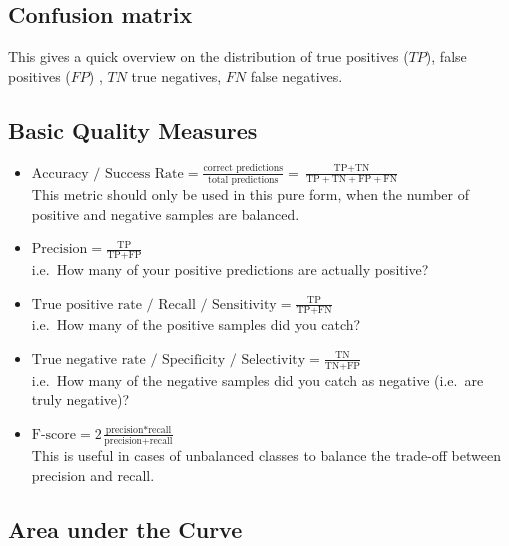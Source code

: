 \documentclass[
]{book}
\begin{document}
\hypertarget{confusion-matrix}{%
\subsection{Confusion matrix}\label{confusion-matrix}}

This gives a quick overview on the distribution of true positives
(\(TP\)), false positives (\(FP\)) , \(TN\) true negatives, \(FN\) false
negatives.

\hypertarget{basic-quality-measures}{%
\subsection{Basic Quality Measures}\label{basic-quality-measures}}

\begin{itemize}
\item
  \(\text{Accuracy / Success Rate} = \frac{ \text{correct predictions}}{\text{total predictions}} = \frac{ \text{TP}+\text{TN}}{\text{TP} + \text{TN}+\text{FP}+\text{FN}}\)\\
  This metric should only be used in this pure form, when the number
  of positive and negative samples are balanced.
\item
  \(\text{Precision} = \frac{\text{TP}}{\text{TP}+\text{FP}}\)\\
  i.e.~How many of your positive predictions are actually positive?
\item
  \(\text{True positive rate / Recall / Sensitivity} = \frac{\text{TP}}{\text{TP}+\text{FN}}\)\\
  i.e.~How many of the positive samples did you catch?
\item
  \(\text{True negative rate / Specificity / Selectivity} = \frac{\text{TN}}{\text{TN}+\text{FP}}\)\\
  i.e.~How many of the negative samples did you catch as negative
  (i.e.~are truly negative)?
\item
  \(\text{F-score} = 2 \frac{\text{precision} * \text{recall}}{\text{precision}+\text{recall}}\)\\
  This is useful in cases of unbalanced classes to balance the
  trade-off between precision and recall.
\end{itemize}

\hypertarget{area-under-the-curve}{%
\subsection{Area under the Curve}\label{area-under-the-curve}}
\end{document}
